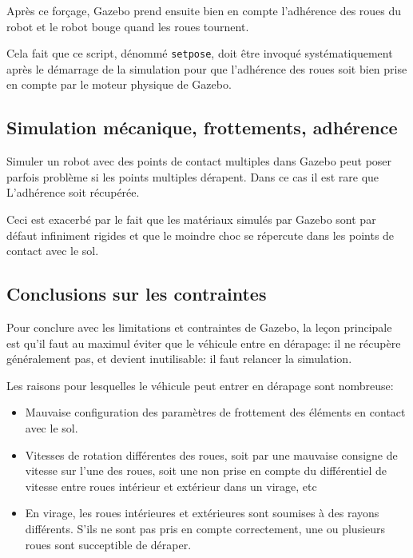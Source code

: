 \documentclass[12pt,a4paper]{report}
\begin{document}
		\para Après ce forçage, Gazebo prend ensuite bien en compte l'adhérence des roues du robot et le robot bouge quand les roues tournent. 
		
		\para Cela fait que ce script, dénommé \verb|setpose|, doit être invoqué systématiquement après le démarrage de la simulation pour que l'adhérence des roues soit bien prise en compte par le moteur physique de Gazebo.
		
		\subsection{Simulation mécanique, frottements, adhérence}
		
		Simuler un robot avec des points de contact multiples dans Gazebo peut poser parfois problème si les points multiples dérapent. Dans ce cas il est rare que L'adhérence soit récupérée.
		
		\para Ceci est exacerbé par le fait que les matériaux simulés par Gazebo sont par défaut infiniment rigides et que le moindre choc se répercute dans les points de contact avec le sol. 

		
		\subsection{Conclusions sur les contraintes}
		\label{conc-contrainte-gazebo}
		Pour conclure avec les limitations et contraintes de Gazebo, la leçon principale est qu'il faut au maximul éviter que le véhicule entre en dérapage: il ne récupère généralement pas, et devient inutilisable: il faut relancer la simulation.
		
		\para Les raisons pour lesquelles le véhicule peut entrer en dérapage sont nombreuse:
		\begin{itemize}
			\item Mauvaise configuration des paramètres de frottement des éléments en contact avec le sol.
			\item  Vitesses de rotation différentes des roues, soit par une mauvaise consigne de vitesse sur l'une des roues, soit une non prise en compte du différentiel de vitesse entre roues intérieur et extérieur dans un virage, etc
			
			\item En virage, les roues intérieures et extérieures sont soumises à des rayons différents. S'ils ne sont pas pris en compte correctement, une ou plusieurs roues sont succeptible de déraper.
		\end{itemize}
\end{document}
